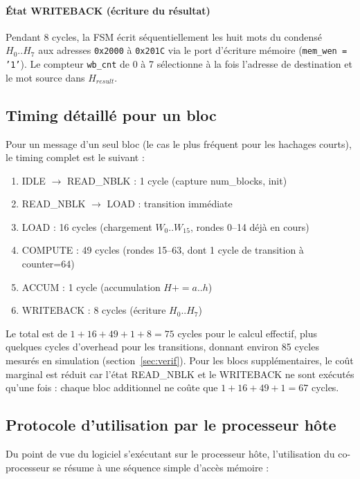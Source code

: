 \paragraph{État WRITEBACK (écriture du résultat)} Pendant 8 cycles, la FSM écrit séquentiellement les huit mots du condensé $H_0..H_7$ aux adresses \texttt{0x2000} à \texttt{0x201C} via le port d'écriture mémoire (\texttt{mem\_wen = '1'}). Le compteur \texttt{wb\_cnt} de 0 à 7 sélectionne à la fois l'adresse de destination et le mot source dans $H_{result}$.

\subsection{Timing détaillé pour un bloc}

Pour un message d'un seul bloc (le cas le plus fréquent pour les hachages courts), le timing complet est le suivant :

\begin{enumerate}
    \item IDLE $\rightarrow$ READ\_NBLK : 1 cycle (capture num\_blocks, init)
    \item READ\_NBLK $\rightarrow$ LOAD : transition immédiate
    \item LOAD : 16 cycles (chargement $W_0..W_{15}$, rondes 0--14 déjà en cours)
    \item COMPUTE : 49 cycles (rondes 15--63, dont 1 cycle de transition à counter=64)
    \item ACCUM : 1 cycle (accumulation $H += a..h$)
    \item WRITEBACK : 8 cycles (écriture $H_0..H_7$)
\end{enumerate}

Le total est de $1 + 16 + 49 + 1 + 8 = 75$ cycles pour le calcul effectif, plus quelques cycles d'overhead pour les transitions, donnant environ 85 cycles mesurés en simulation (section~\ref{sec:verif}). Pour les blocs supplémentaires, le coût marginal est réduit car l'état READ\_NBLK et le WRITEBACK ne sont exécutés qu'une fois : chaque bloc additionnel ne coûte que $1 + 16 + 49 + 1 = 67$ cycles.

\subsection{Protocole d'utilisation par le processeur hôte}

Du point de vue du logiciel s'exécutant sur le processeur hôte, l'utilisation du co-processeur se résume à une séquence simple d'accès mémoire :

